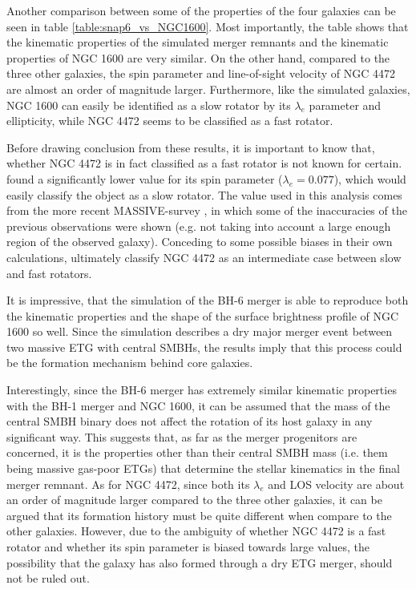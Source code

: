 \documentclass[english, oneside]{HYgradu}
\begin{document}
Another comparison between some of the properties of the four galaxies can be seen in table \ref{table:snap6_vs_NGC1600}. Most importantly, the table shows that the kinematic properties of the simulated merger remnants and the kinematic properties of NGC 1600 are very similar. On the other hand, compared to the three other galaxies, the spin parameter and line-of-sight velocity of NGC 4472 are almost an order of magnitude larger. Furthermore, like the simulated galaxies, NGC 1600 can easily be identified as a slow rotator by its $\lambda_e$ parameter and ellipticity, while NGC 4472 seems to be classified as a fast rotator. 

Before drawing conclusion from these results, it is important to know that, whether NGC 4472 is in fact classified as a fast rotator is not known for certain. \cite{Emsellem2011} found a significantly lower value for its spin parameter ($\lambda_e = 0.077$), which would easily classify the object as a slow rotator. The value used in this analysis comes from the more recent MASSIVE-survey \citep{Ma2014MASSIVE, Veale2017veldisp}, in which some of the inaccuracies of the previous observations were shown (e.g. not taking into account a large enough region of the observed galaxy). Conceding to some possible biases in their own calculations, \cite{Veale2017veldisp} ultimately classify NGC 4472 as an intermediate case between slow and fast rotators.

It is impressive, that the simulation of the BH-6 merger is able to reproduce both the kinematic properties and the shape of the surface brightness profile of NGC 1600 so well. Since the simulation describes a dry major merger event between two massive ETG with central SMBHs, the results imply that this process could be the formation mechanism behind core galaxies. 

Interestingly, since the BH-6 merger has extremely similar kinematic properties with the BH-1 merger and NGC 1600, it can be assumed that the mass of the central SMBH binary does not affect the rotation of its host galaxy in any significant way. This suggests that, as far as the merger progenitors are concerned, it is the properties other than their central SMBH mass (i.e. them being massive gas-poor ETGs) that determine the stellar kinematics in the final merger remnant. As for NGC 4472, since both its $\lambda_e$ and LOS velocity are about an order of magnitude larger compared to the three other galaxies, it can be argued that its formation history must be quite different when compare to the other galaxies. However, due to the ambiguity of whether NGC 4472 is a fast rotator and whether its spin parameter is biased towards large values, the possibility that the galaxy has also formed through a dry ETG merger, should not be ruled out.
\end{document}
